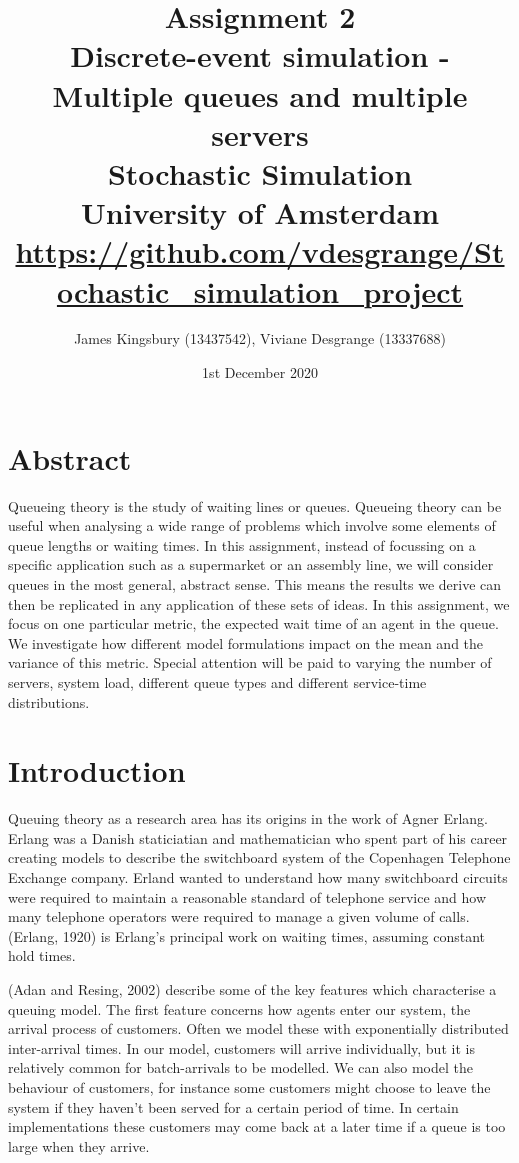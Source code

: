 \documentclass{article}
\title{Assignment 2 \\  Discrete-event simulation - Multiple queues and multiple servers \\ \large Stochastic Simulation \\University of Amsterdam\\
\href{https://github.com/vdesgrange/Stochastic_simulation_project}{https://github.com/vdesgrange/Stochastic\_simulation\_project}}
\author{James Kingsbury (13437542), Viviane Desgrange (13337688) }
\date{1st December 2020}
\begin{document}
    \begin{titlingpage}
        \maketitle
    \end{titlingpage}


    \section*{Abstract}
    Queueing theory is the study of waiting lines or queues. Queueing theory can be useful when analysing a wide range of problems which involve some elements of queue lengths or waiting times. In this assignment, instead of focussing on a specific application such as a supermarket or an assembly line, we will consider queues in the most general, abstract sense. This means the results we derive can then be replicated in any application of these sets of ideas. In this assignment, we focus on one particular metric, the expected wait time of an agent in the queue. We investigate how different model formulations impact on the mean and the variance of this metric. Special attention will be paid to varying the number of servers, system load, different queue types and different service-time distributions.

    \section*{Introduction}
    Queuing theory as a research area has its origins in the work of Agner Erlang. Erlang was a Danish staticiatian and mathematician who spent part of his career creating models to describe the switchboard system of the Copenhagen Telephone Exchange company. Erland wanted to understand how many switchboard circuits were required to maintain a reasonable standard of telephone service and how many telephone operators were required to manage a given volume of calls. (Erlang, 1920) is Erlang's principal work on waiting times, assuming constant hold times.

    (Adan and Resing, 2002) describe some of the key features which characterise a queuing model. The first feature concerns how agents enter our system, the arrival process of customers. Often we model these with exponentially distributed inter-arrival times. In our model, customers will arrive individually, but it is relatively common for batch-arrivals to be modelled. We can also model the behaviour of customers, for instance some customers might choose to leave the system if they haven't been served for a certain period of time. In certain implementations these customers may come back at a later time if a queue is too large when they arrive.
\end{document}
